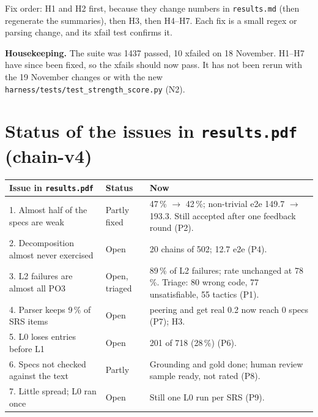 \documentclass[11pt,a4paper]{article}
\newcommand{\file}[1]{\texttt{#1}}
\begin{document}
\noindent Fix order: H1 and H2 first, because they change numbers in \file{results.md} (then
regenerate the summaries), then H3, then H4--H7. Each fix is a small regex or parsing change, and its
xfail test confirms it.

\smallskip\noindent\textbf{Housekeeping.} The suite was 1437 passed, 10 xfailed on 18 November.
H1--H7 have since been fixed, so the xfails should now pass. It has not been rerun with the 19 November
changes or with the new \file{harness/tests/test\_strength\_score.py} (N2).

\section{Status of the issues in \file{results.pdf} (chain-v4)}\label{sec:status}

\begin{center}
\begin{tabularx}{\textwidth}{@{}p{5.2cm}p{2.0cm}L@{}}
\toprule
Issue in \file{results.pdf} & Status & Now \\
. Almost half of the specs are weak & Partly fixed & 47\,\% $\to$ 42\,\%; non-trivial e2e
  149.7 $\to$ 193.3. Still accepted after one feedback round (P2). \\
2. Decomposition almost never exercised & Open & 20 chains of 502; 12.7 e2e (P4). \\
3. L2 failures are almost all PO3 & Open, triaged & 89\,\% of L2 failures; rate unchanged at 78\,\%.
  Triage: 80 wrong code, 77 unsatisfiable, 55 tactics (P1). \\
4. Parser keeps 9\,\% of SRS items & Open & peering and get real 0.2 now reach 0 specs (P7); H3. \\
5. L0 loses entries before L1 & Open & 201 of 718 (28\,\%) (P6). \\
6. Specs not checked against the text & Partly & Grounding and gold done; human review sample
  ready, not rated (P8). \\
7. Little spread; L0 ran once & Open & Still one L0 run per SRS (P9). \\
\bottomrule
\end{tabularx}
\end{center}
\end{document}
